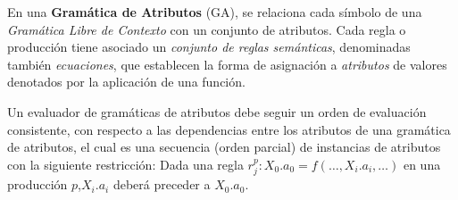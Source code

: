\documentclass[runningheads,a4paper]{llncs}
\begin{document}
% 
% 
% 
% 
%       
% 
%       
% 
% 

En una \textbf{Gramática de Atributos} (GA), se relaciona cada símbolo de una \textit{Gramática Libre de Contexto} con un conjunto de atributos. Cada regla o producción tiene asociado un \textit{conjunto de reglas semánticas}, denominadas también \textit{ecuaciones}, que establecen la forma de asignación a \textit{atributos} de valores denotados por la aplicación de una función.%


Un evaluador de gramáticas de atributos debe %
seguir un orden de evaluación consistente, con respecto a las dependencias entre los atributos de una gramática de atributos, el cual es una secuencia (orden parcial) de instancias de atributos con la siguiente restricción:
Dada una regla $r_{j}^{p} : X_{0}.a_{0} = f(\ldots, X_{i}.a_{i}, \ldots)$ en una producción $p$,$X_{i}.a_{i}$ deberá preceder a $X_{0}.a_{0}$.
\end{document}

